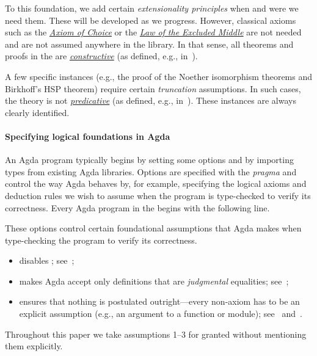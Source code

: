 To this foundation, we add certain \textit{extensionality principles} when and were we need them.  These will be developed as we progress.  However, classical axioms such as the \href{https://ncatlab.org/nlab/show/axiom+of+choice}{\textit{Axiom of Choice}} or the \href{https://ncatlab.org/nlab/show/excluded+middle}{\textit{Law of the Excluded Middle}} are not needed and are not assumed anywhere in the library.  In that sense, all theorems and proofs in the \ualib are \href{https://ncatlab.org/nlab/show/constructive+mathematics}{\textit{constructive}} (as defined, e.g., in~\cite{nlab:constructive_mathematics}).

A few specific instances (e.g., the proof of the Noether isomorphism theorems and Birkhoff's HSP theorem) require certain \textit{truncation} assumptions. In such cases, the theory is not \href{https://ncatlab.org/nlab/show/predicative+mathematics}{\textit{predicative}} (as defined, e.g., in~\cite{nlab:predicative_mathematics}). These instances are always clearly identified.




\paragraph*{Specifying logical foundations in Agda}
An Agda program typically begins by setting some options and by importing types from existing Agda libraries.
Options are specified with the  \emph{pragma} and control the way Agda behaves by, for example, specifying the logical axioms and deduction rules we wish to assume when the program is type-checked to verify its correctness. Every Agda program in the \ualib begins with the following line.
\ccpad
\begin{code}[number=code:options]
\>[0]\AgdaSymbol{\{-\#}\AgdaSpace{}%
\AgdaSpace{}%
\AgdaSpace{}%
\AgdaSpace{}%
\AgdaSpace{}%
\AgdaSymbol{\#-\}}\<%
\end{code}
\ccpad
These options control certain foundational assumptions that Agda makes when type-checking the program to verify its correctness.
\begin{itemize}
\item {} disables \axiomk; see~\cite{agdaref-axiomk};
\item {} makes Agda accept only definitions that are \emph{judgmental} equalities; see~\cite{agdatools-patternmatching};
\item {} ensures that nothing is postulated outright---every non-\mltt axiom has to be an explicit assumption (e.g., an argument to a function or module); see~\cite{agdaref-safeagda} and~\cite{agdatools-patternmatching}.
\end{itemize}
Throughout this paper we take assumptions 1--3 for granted without mentioning them explicitly.


